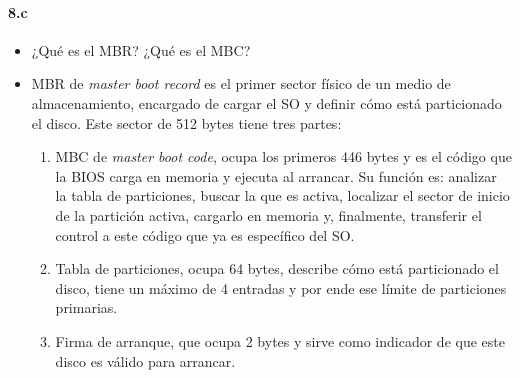 \documentclass[10pt,a4paper]{paper}
\begin{document}
	\paragraph{8.c}
	\begin{itemize}
		\item ¿Qué es el MBR? ¿Qué es el MBC?
		
		\item MBR de \textit{master boot record} es el primer sector físico de un
		medio de almacenamiento, encargado de cargar el SO y definir cómo está
		particionado el disco. Este sector de 512 bytes tiene tres partes:
		
		\begin{enumerate}
			\item MBC de \textit{master boot code}, ocupa los primeros 446 bytes y es el
			código que la BIOS carga en memoria y ejecuta al arrancar. Su función es:
			analizar la tabla de particiones, buscar la que es activa, localizar el sector
			de inicio de la partición activa, cargarlo en memoria y, finalmente, transferir
			el control a este código que ya es específico del SO.
			
			\item Tabla de particiones, ocupa 64 bytes, describe cómo está particionado
			el disco, tiene un máximo de 4 entradas y por ende ese límite de particiones
			primarias.
			
			\item Firma de arranque, que ocupa 2 bytes y sirve como indicador de que este
			disco es válido para arrancar.
		\end{enumerate}
		
		
	\end{itemize}
	
	
	
\end{document}
